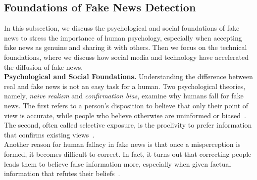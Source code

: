 \subsection{Foundations of Fake News Detection}
\label{subsec:fakeNewsDetection_FoundationsOfFakeNews}
In this subsection, we discuss the psychological and social foundations of fake news to stress the importance
of human psychology, especially when accepting fake news as genuine and sharing it with others. Then we focus on
the technical foundations, where we discuss how social media and technology have accelerated the diffusion of fake news.\\
\textbf{Psychological and Social Foundations.}  Understanding the difference between real and fake news is not an easy task
for a human. Two psychological theories, namely, \emph{naive realism} and \emph{confirmation bias}, examine why humans fall for fake news. The first refers to a person's disposition to believe that only their point of view is accurate, while people who believe otherwise are uninformed or biased~\parencite{NaiveRealism_Reed}. The second, often called selective exposure, is the proclivity to prefer information that confirms existing views~\parencite{ConfirmationBias_Nickerson}.\\
Another reason for human fallacy in fake news is that once a misperception is formed, it becomes difficult to correct. In fact, it turns out that correcting people leads them to believe false information more, especially
when given factual information that refutes their beliefs~\parencite{WhenCorrectionsFail_Nyhan}.\\
